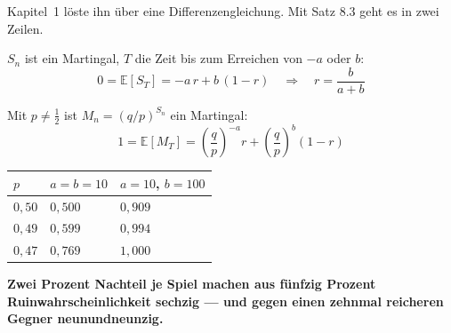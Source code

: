 \begin{merksatz}
Kapitel~1 löste ihn über eine Differenzengleichung. Mit Satz 8.3 geht es in zwei Zeilen.

$S_n$ ist ein Martingal, $T$ die Zeit bis zum Erreichen von $-a$ oder $b$:
\[ 0 = \mathbb{E}[S_T] = -a\,r + b\,(1-r) \quad\Longrightarrow\quad r = \frac{b}{a+b} \]

Mit $p \ne \tfrac12$ ist $M_n = (q/p)^{S_n}$ ein Martingal:
\[ 1 = \mathbb{E}[M_T] = \left(\frac qp\right)^{-a}r + \left(\frac qp\right)^{b}(1-r) \]

\begin{center}
{\small
\renewcommand{\arraystretch}{1.48}
\begin{tabular}{@{}P{1.8cm}P{2.4cm}P{2.6cm}@{}}
\toprule
$p$ & $a=b=10$ & $a=10$, $b=100$\\
\midrule
$0{,}50$ & $0{,}500$ & $0{,}909$\\
$0{,}49$ & $0{,}599$ & $0{,}994$\\
$0{,}47$ & $0{,}769$ & $1{,}000$\\
\bottomrule
\end{tabular}}
\end{center}

\begin{center}
\begin{minipage}{0.9\textwidth}
\textbf{Zwei Prozent Nachteil je Spiel machen aus fünfzig Prozent Ruinwahrscheinlichkeit sechzig --- und gegen einen zehnmal reicheren Gegner neunundneunzig.}
\end{minipage}
\end{center}

\begin{center}
\begin{minipage}{0.88\textwidth}
\end{minipage}
\end{center}
\end{merksatz}

